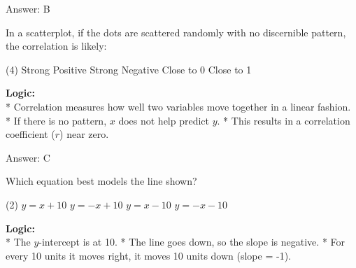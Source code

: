 \documentclass[11pt,paper=a4,answers]{exam}
\begin{document}
\begin{questions}
\begin{solution}
\vspace{30pt}

Answer: \colorbox{yellow!100}{B}
\end{solution}

\vspace{60pt}

\question
In a scatterplot, if the dots are scattered randomly with no discernible pattern, the correlation is likely:
\begin{tasks}(4)
    \task Strong Positive
    \task Strong Negative
    \task Close to 0
    \task Close to 1
\end{tasks}

\begin{solution}
\textbf{Logic:} \\
* Correlation measures how well two variables move together in a linear fashion.
* If there is no pattern, $x$ does not help predict $y$.
* This results in a correlation coefficient ($r$) near zero.

\vspace{30pt}

Answer: \colorbox{yellow!100}{C}
\end{solution}

\vspace{60pt}

\question
\begin{center}
\end{center}
Which equation best models the line shown?
\begin{tasks}(2)
    \task $y = x + 10$
    \task $y = -x + 10$
    \task $y = x - 10$
    \task $y = -x - 10$
\end{tasks}

\begin{solution}
\textbf{Logic:} \\
* The $y$-intercept is at 10.
* The line goes down, so the slope is negative.
* For every 10 units it moves right, it moves 10 units down (slope = -1).


\end{solution}
\end{questions}
\end{document}
